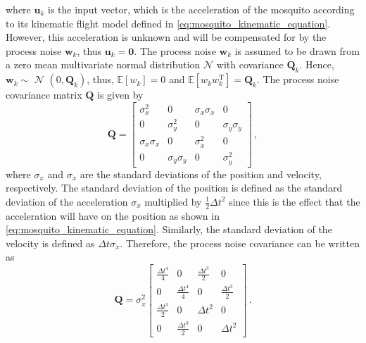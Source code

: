 where $\mathbf{u}_k$ is the input vector, which is the acceleration of the mosquito according to its kinematic flight model defined in \autoref{eq:mosquito_kinematic_equation}. However, this acceleration is unknown and will be compensated for by the process noise $\mathbf{w}_k$, thus $\mathbf{u}_k = \mathbf{0}$. The process noise $\mathbf{w}_k$ is assumed to be drawn from a zero mean multivariate normal distribution $\mathcal{N}$ with covariance $\mathbf{Q}_k$. Hence, $\mathbf{w}_k \sim$ $\mathcal{N}$ $\left(0, \mathbf{Q}_k\right)$, thus, $\mathbb{E}[w_k] = 0$ and $\mathbb{E}[w_kw_k^\mathrm{T}] = \mathbf{Q}_k$. The process noise covariance matrix $\mathbf{Q}$ is given by
\begin{equation}
    \label{eq:kalman_filter_process_noise_covariance_matrix}
    \mathbf{Q} = \begin{bmatrix}
        \sigma_{x}^2               & 0                          & \sigma_{x}\sigma_{\dot{x}} & 0                          \\
        0                          & \sigma_{y}^2               & 0                          & \sigma_{y}\sigma_{\dot{y}} \\
        \sigma_{\dot{x}}\sigma_{x} & 0                          & \sigma_{\dot{x}}^2         & 0                          \\
        0                          & \sigma_{\dot{y}}\sigma_{y} & 0                          & \sigma_{\dot{y}}^2
    \end{bmatrix}\,,
\end{equation}
where $\sigma_{x}$ and $\sigma_{\dot{x}}$ are the standard deviations of the position and velocity, respectively. The standard deviation of the position is defined as the standard deviation of the acceleration $\sigma_{\ddot{x}}$ multiplied by $\frac{1}{2}\Delta t^2$ since this is the effect that the acceleration will have on the position as shown in \autoref{eq:mosquito_kinematic_equation}. Similarly, the standard deviation of the velocity is defined as $\Delta t \sigma_{\ddot{x}}$. Therefore, the process noise covariance can be written as
\begin{equation}
    \mathbf{Q} =
    \sigma_{\ddot{x}}^{2}
    \begin{bmatrix}
        \frac{\Delta t^4}{4} & 0                    & \frac{\Delta t^3}{2} & 0                    \\
        0                    & \frac{\Delta t^4}{4} & 0                    & \frac{\Delta t^3}{2} \\
        \frac{\Delta t^3}{2} & 0                    & \Delta t^2           & 0                    \\
        0                    & \frac{\Delta t^3}{2} & 0                    & \Delta t^2
    \end{bmatrix}\,.
\end{equation}

